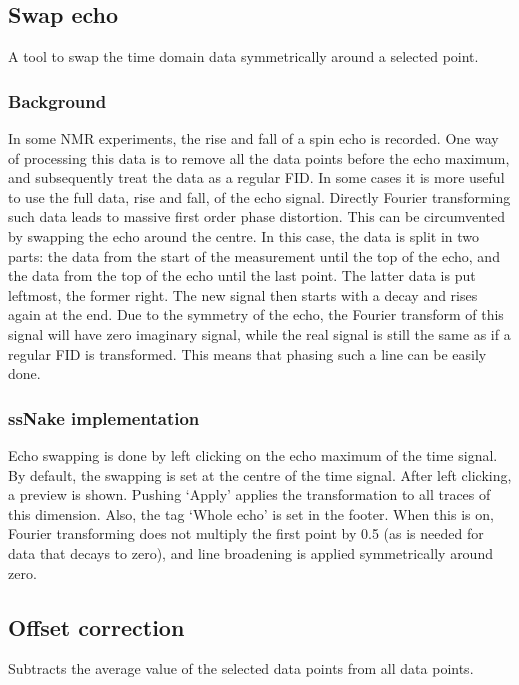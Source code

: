 \documentclass[11pt,a4paper]{article}
\begin{document}
\subsection{Swap echo}
A tool to swap the time domain data symmetrically around a selected point.

\subsubsection*{Background}
In some NMR experiments, the rise and fall of a spin echo is recorded. One way of processing this data is to remove all the data points before the echo maximum, and subsequently treat the data as a regular FID. In some cases it is more useful to use the full data, rise and fall, of the echo signal. Directly Fourier transforming such data leads to massive first order phase distortion. This can be circumvented by swapping the echo around the centre. In this case, the data is split in two parts: the data from the start of the measurement until the top of the echo, and the data from the top of the echo until the last point. The latter data is put leftmost, the former right. The new signal then starts with a decay and rises again at the end. Due to the symmetry of the echo, the Fourier transform of this signal will have zero imaginary signal, while the real signal is still the same as if a regular FID is transformed. This means that phasing such a line can be easily done.

\subsubsection*{ssNake implementation}
Echo swapping is done by left clicking on the echo maximum of the time signal. By default, the swapping is set at the centre of the time signal. After left clicking, a preview is shown. Pushing `Apply' applies the transformation to all traces of this dimension. Also, the tag `Whole echo' is set in the footer. When this is on, Fourier transforming does not multiply the first point by 0.5 (as is needed for data that decays to zero), and line broadening is applied symmetrically around zero.







\subsection{Offset correction}
Subtracts the average value of the selected data points from all data points.
\end{document}
